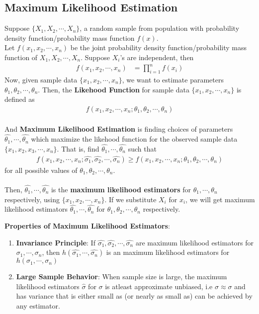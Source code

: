 \subsection[Maximum Likelihood Estimation]{Maximum Likelihood Estimation}
\begin{defn}
Suppose $\{X_1,X_2,\cdots,X_n\}$, a random sample from population with probability density function/probability mass function $f(x)$.\\
Let $f(x_1,x_2,\cdots,x_n)$ be the joint probability density function/probability mass function of $X_1,X_2,\cdots,X_n$. Suppose $X_i$'s are independent, then \begin{align*}
f(x_1,x_2,\cdots,x_n)&=\prod_{i=1}^nf(x_i)
\end{align*} 
Now, given sample data $\{x_1,x_2,\cdots,x_n\}$, we want to estimate parameters $\theta_1,\theta_2,\cdots,\theta_n$. Then, the \textbf{Likehood Function} for sample data $\{x_1,x_2,\cdots,x_n\}$ is defined as \begin{align*}
f(x_1,x_2,\cdots,x_n;\theta_1,\theta_2,\cdots,\theta_n)
\end{align*}
\hfill\\
And \textbf{Maximum Likelihood Estimation} is finding choices of parameters $\widehat{\theta_1},\cdots,\widehat{\theta_n}$ which maximize the likehood function for the observed sample data $\{x_1,x_2,x_3,\cdots,x_n\}$. That is, find $\widehat{\theta_1},\cdots,\widehat{\theta_n}$ such that \begin{align*}
f(x_1,x_2,\cdots,x_n;\widehat{\sigma_1},\widehat{\sigma_2},\cdots,\widehat{\sigma_n})\geq f(x_1,x_2,\cdots,x_n;\theta_1,\theta_2,\cdots,\theta_n)
\end{align*}
for all possible values of $\theta_1,\theta_2,\cdots,\theta_n$.\\
\hfill\\
Then, $\widehat{\theta_1},\cdots,\widehat{\theta_n}$ is the \textbf{maximum likelihood estimators} for $\theta_1,\cdots,\theta_n$ respectively, using $\{x_1,x_2,\cdots,x_n\}$. If we substitute $X_i$ for $x_i$, we will get maximum likelihood estimators $\widehat{\theta_1},\cdots,\widehat{\theta_n}$ for $\theta_1,\theta_2,\cdots,\theta_n$ respectively.
\end{defn}
\begin{thm}
\textbf{Properties of Maximum Likelihood Estimators}:\begin{enumerate}
\item \textbf{Invariance Principle}: If $\widehat{\sigma_1},\widehat{\sigma_2},\cdots, \widehat{\sigma_n}$ are maximum likelihood estimators for $\sigma_1,\cdots,\sigma_n$, then $h(\widehat{\sigma_1},\cdots,\widehat{\sigma_n})$ is an maximum likelihood estimators for $h(\sigma_1,\cdots,\sigma_n)$
\item \textbf{Large Sample Behavior}: When sample size is large, the maximum likelihood estimators $\widehat{\sigma}$ for $\sigma$ is atleast approximate unbiased, i.e $\widehat{\sigma}\approx \sigma$ and has variance that is either small as (or nearly as small as) can be achieved by any estimator.
\end{enumerate}
\end{thm}
